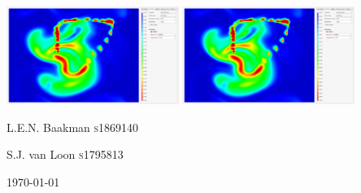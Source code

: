 \begin{titlepage}
        \vspace{10px}
        \includegraphics[width=0.42\textwidth, height=0.5\textheight, keepaspectratio=true]{colormapping/img/clamped_01.png} \hspace{10px}
        \includegraphics[width=0.42\textwidth, height=0.5\textheight, keepaspectratio=true]{colormapping/img/clamped_01.png}        
    \vspace{2cm}\par

    {\Large L.E.N. Baakman \textsc{s}1869140\par}
    {\Large S.J. van Loon \textsc{s}1795813\par}

    \vfill
    {\large \today\par}
\end{titlepage}
\hypersetup{pageanchor=true}